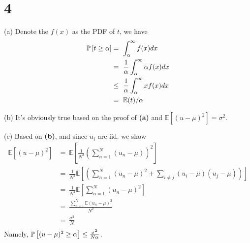 \documentclass{article}
\begin{document}
\section{4 }
\def\E{\mathbb{E}}
\begin{tlist}{4}
	\item[(a)]
	Denote the $f(x)$ as the PDF of $t$, we have
	\begin{align*}
		\P\left[t\geq \alpha\right]
		 & =\ \int_\alpha^\infty f(x)dx                        \\
		 & =\ \frac{1}{\alpha}\int_\alpha^\infty \alpha f(x)dx \\
		 & \leq\ \frac{1}{\alpha}\int_\alpha^\infty xf(x)dx    \\
		 & =\ \E(t)/\alpha                                     \\
	\end{align*}
	\item[(b)]
	It's obviously true based on the proof of \textbf{(a)} and $\E\left[(u-\mu)^2\right]=\sigma^2$.
	\item[(c)]
	Based on \textbf{(b)}, and since $u_i$ are iid. we show
	\begin{align*}
		\E\left[(u-\mu)^2\right]
		 & =\ \E\left[\frac{1}{N^2}\left(\sum_{n=1}^N(u_n-\mu)\right)^2\right]                                  \\
		 & =\ \frac{1}{N^2}\E\left[\left(\sum_{n=1}^N(u_n-\mu)^2+\sum_{i\neq j}(u_i-\mu)(u_j-\mu)\right)\right] \\
		 & =\ \frac{1}{N^2}\E\left[\sum_{n=1}^N(u_n-\mu)^2\right]                                               \\
		 & =\ \frac{\sum_{n=1}^N\E(u_n-\mu)^2}{N^2}                                                             \\
		 & =\ \frac{\sigma^2}{N}                                                                                \\
	\end{align*}
	Namely, $\P\left[(u-\mu)^2\geq \alpha\right]\leq\frac{\sigma^2}{N\alpha}$.
\end{tlist}
\end{document}
